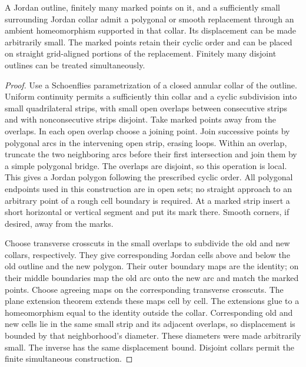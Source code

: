\begin{lemma}
\label{if:regularization}
A Jordan outline, finitely many marked points on it, and a sufficiently
small surrounding Jordan collar admit a polygonal or smooth replacement
through an ambient homeomorphism supported in that collar.  Its
displacement can be made arbitrarily small.  The marked points retain
their cyclic order and can be placed on straight grid-aligned portions
of the replacement.  Finitely many disjoint outlines can be treated
simultaneously.
\end{lemma}

\begin{proof}
Use a Schoenflies parametrization of a closed annular collar of the
outline.  Uniform continuity permits a sufficiently thin collar and
a cyclic subdivision into small quadrilateral strips, with small
open overlaps between consecutive strips and with nonconsecutive
strips disjoint.  Take marked points away from the overlaps.  In
each open overlap choose a joining point.  Join successive points
by polygonal arcs in the intervening open strip, erasing loops.
Within an overlap, truncate the two neighboring arcs before their
first intersection and join them by a simple polygonal bridge.
The overlaps are disjoint, so this operation is local.  This gives
a Jordan polygon following the prescribed cyclic order.  All
polygonal endpoints used in this construction are in open sets;
no straight approach to an arbitrary point of a rough cell boundary
is required.  At a marked strip insert a short horizontal or
vertical segment and put its mark there.  Smooth corners, if
desired, away from the marks.

Choose transverse crosscuts in the small overlaps to subdivide the
old and new collars, respectively.  They give corresponding Jordan
cells above and below the old outline and the new polygon.  Their
outer boundary maps are the identity; on their middle boundaries
map the old arc onto the new arc and match the marked points.
Choose agreeing maps on the corresponding transverse crosscuts.
The plane extension theorem extends these maps cell by cell.
The extensions glue to a homeomorphism equal to the identity outside
the collar.  Corresponding old and new cells lie in the same small
strip and its adjacent overlaps, so displacement is bounded by
that neighborhood's diameter.  These diameters were made arbitrarily
small.  The inverse has the same displacement bound.  Disjoint
collars permit the finite simultaneous construction.
\end{proof}


